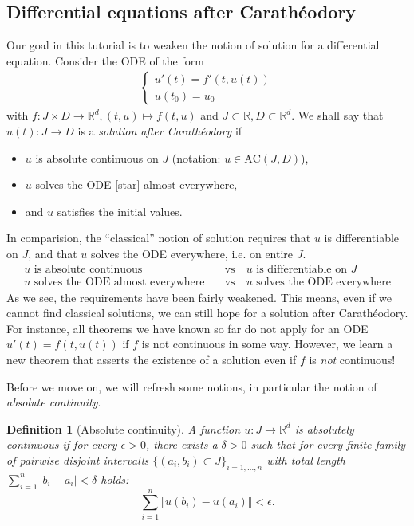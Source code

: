 \documentclass[a4paper, 11pt]{article}
\newtheorem{definition}[theorem]{Definition}
\begin{document}
\subsection*{Differential equations after Carathéodory}
Our goal in this tutorial is to weaken the notion of solution for a differential equation. Consider the ODE of the form
\begin{align}\label{star}
\begin{cases}
u'(t) = f'(t,u(t)) \\
u(t_0) = u_0
\end{cases}
\tag{$\star$}
\end{align}
with $f: J \times D \to \mathbb R^d, (t,u) \mapsto f(t,u)$ and $J\subset \mathbb R, D \subset \mathbb R^d$. We shall say that $u(t): J \to D$ is a \emph{solution after Carathéodory} if
\begin{itemize}
	\item $u$ is absolute continuous on $J$ (notation: $u \in \mathrm{AC}(J, D)$),
	\item $u$ solves the ODE \eqref{star} almost everywhere,
	\item and $u$ satisfies the initial values.
\end{itemize}
In comparision, the ``classical'' notion of solution requires that $u$ is differentiable on $J$, and that $u$ solves the ODE everywhere, i.e. on entire $J$.
\begin{align*}
\text{$u$ is absolute continuous} \quad &\text{vs} \quad \text{$u$ is differentiable on $J$} \\
\text{$u$ solves the ODE almost everywhere} \quad &\text{vs} \quad \text{$u$ solves the ODE everywhere}
\end{align*}
As we see, the requirements have been fairly weakened. This means, even if we cannot find classical solutions, we can still hope for a solution after Carathéodory. For instance, all theorems we have known so far do not apply for an ODE $u'(t) = f(t,u(t))$ if $f$ is not continuous in some way. However, we learn a new theorem that asserts the existence of a solution even if $f$ is \emph{not} continuous!

Before we move on, we will refresh some notions, in particular the notion of \emph{absolute continuity}.

\begin{definition}[Absolute continuity]
	A function $u: J \to \mathbb R^d$ is \emph{absolutely continuous} if for every $\epsilon > 0$, there exists a $\delta > 0$ such that for every finite family of pairwise disjoint intervalls $\{ (a_i,b_i) \subset J \}_{i = 1,...,n}$ with total length $\sum^n_{i=1}|b_i-a_i| < \delta$ holds:
	\[
	\sum^n_{i=1} \Vert u(b_i) - u(a_i) \Vert < \epsilon.
	\]
\end{definition}
\end{document}
